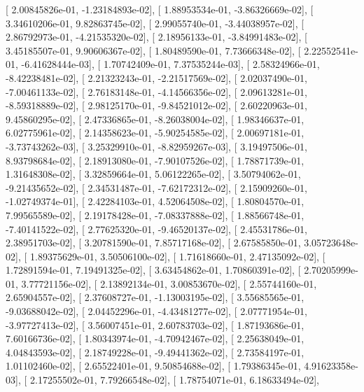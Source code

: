 \documentclass{article}
\begin{document}
       [  2.00845826e-01,  -1.23184893e-02],
       [  1.88953534e-01,  -3.86326669e-02],
       [  3.34610206e-01,   9.82863745e-02],
       [  2.99055740e-01,  -3.44038957e-02],
       [  2.86792973e-01,  -4.21535320e-02],
       [  2.18956133e-01,  -3.84991483e-02],
       [  3.45185507e-01,   9.90606367e-02],
       [  1.80489590e-01,   7.73666348e-02],
       [  2.22552541e-01,  -6.41628444e-03],
       [  1.70742409e-01,   7.37535244e-03],
       [  2.58324966e-01,  -8.42238481e-02],
       [  2.21323243e-01,  -2.21517569e-02],
       [  2.02037490e-01,  -7.00461133e-02],
       [  2.76183148e-01,  -4.14566356e-02],
       [  2.09613281e-01,  -8.59318889e-02],
       [  2.98125170e-01,  -9.84521012e-02],
       [  2.60220963e-01,   9.45860295e-02],
       [  2.47336865e-01,  -8.26038004e-02],
       [  1.98346637e-01,   6.02775961e-02],
       [  2.14358623e-01,  -5.90254585e-02],
       [  2.00697181e-01,  -3.73743262e-03],
       [  3.25329910e-01,  -8.82959267e-03],
       [  3.19497506e-01,   8.93798684e-02],
       [  2.18913080e-01,  -7.90107526e-02],
       [  1.78871739e-01,   1.31648308e-02],
       [  3.32859664e-01,   5.06122265e-02],
       [  3.50794062e-01,  -9.21435652e-02],
       [  2.34531487e-01,  -7.62172312e-02],
       [  2.15909260e-01,  -1.02749374e-01],
       [  2.42284103e-01,   4.52064508e-02],
       [  1.80804570e-01,   7.99565589e-02],
       [  2.19178428e-01,  -7.08337888e-02],
       [  1.88566748e-01,  -7.40141522e-02],
       [  2.77625320e-01,  -9.46520137e-02],
       [  2.45531786e-01,   2.38951703e-02],
       [  3.20781590e-01,   7.85717168e-02],
       [  2.67585850e-01,   3.05723648e-02],
       [  1.89375629e-01,   3.50506100e-02],
       [  1.71618660e-01,   2.47135092e-02],
       [  1.72891594e-01,   7.19491325e-02],
       [  3.63454862e-01,   1.70860391e-02],
       [  2.70205999e-01,   3.77721156e-02],
       [  2.13892134e-01,   3.00853670e-02],
       [  2.55744160e-01,   2.65904557e-02],
       [  2.37608727e-01,  -1.13003195e-02],
       [  3.55685565e-01,  -9.03688042e-02],
       [  2.04452296e-01,  -4.43481277e-02],
       [  2.07771954e-01,  -3.97727413e-02],
       [  3.56007451e-01,   2.60783703e-02],
       [  1.87193686e-01,   7.60166736e-02],
       [  1.80343974e-01,  -4.70942467e-02],
       [  2.25638049e-01,   4.04843593e-02],
       [  2.18749228e-01,  -9.49441362e-02],
       [  2.73584197e-01,   1.01102460e-02],
       [  2.65522401e-01,   9.50854688e-02],
       [  1.79386345e-01,   4.91623358e-03],
       [  2.17255502e-01,   7.79266548e-02],
       [  1.78754071e-01,   6.18633494e-02],
\end{document}
